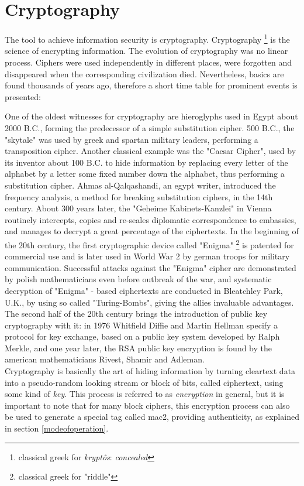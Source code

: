\section{Cryptography}

The tool to achieve information security is cryptography.
Cryptography \footnote{classical greek for \textit{krypt\^{o}s}: \textit{concealed}}
is the science of encrypting information. The evolution of cryptography was no linear process. Ciphers were used independently in different
places, were forgotten and disappeared when the corresponding civilization died. Nevertheless,
basics are found thousands of years ago, therefore a short time table for prominent events is presented:

One of the oldest witnesses for cryptography are hieroglyphs used in Egypt about 2000 B.C., forming the predecessor
of a simple substitution cipher. 500 B.C., the "skytale" was used by greek and spartan military leaders, performing a transposition cipher. Another classical
example was the "Caesar Cipher", used by its inventor about 100 B.C. to hide information by replacing every letter of the alphabet by a letter some fixed number down the alphabet,
thus performing a substitution cipher. Ahmas al-Qalqashandi, an egypt writer, introduced the frequency analysis, a method for breaking substitution ciphers,
in the 14th century. About 300 years later, the "Geheime Kabinets-Kanzlei" in Vienna routinely intercepts, copies and 
 re-seales diplomatic correspondence to embassies, and manages to decrypt a great percentage of the ciphertexts. In the beginning of the 20th century, the 
 first cryptographic device called "Enigma" \footnote{classical greek for "riddle"} is patented for commercial use and is later used in World War 2 by german troops for 
 military communication. Successful attacks against the "Enigma" cipher are demonstrated by polish mathematicians even before outbreak of the war, and systematic
 decryption of "Enigma" - based ciphertexts are conducted in Bleatchley Park, U.K., by using so called "Turing-Bombs", giving the allies invaluable advantages.
The second half of the 20th century brings the introduction of public key cryptography with it: in 1976 Whitfield Diffie and Martin Hellman specify a 
protocol for key exchange, based on a public key system developed by Ralph Merkle, and one year later, the RSA public key encryption is found by the american
mathematicians Rivest, Shamir and Adleman.
\\

Cryptography is basically the art of hiding information by turning cleartext
data into a pseudo-random looking stream or block of bits, called ciphertext, using some kind of
\textit{key}. This process is referred to as \textit{encryption} in general, but it is important to note that for many block ciphers, this encryption process
can also be used to generate a special tag called \gls{mac2}, providing authenticity, as explained in section \ref{modeofoperation}.

